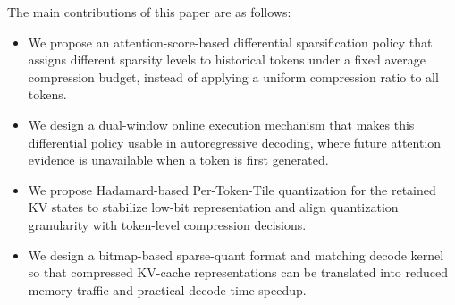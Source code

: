 \documentclass[runningheads]{llncs}
\newcommand{\method}{JSQKV}
\begin{document}
The main contributions of this paper are as follows:
\begin{itemize}
    \item We propose an attention-score-based differential sparsification policy that assigns different sparsity levels to historical tokens under a fixed average compression budget, instead of applying a uniform compression ratio to all tokens.
    \item We design a dual-window online execution mechanism that makes this differential policy usable in autoregressive decoding, where future attention evidence is unavailable when a token is first generated.
    \item We propose Hadamard-based Per-Token-Tile quantization for the retained KV states to stabilize low-bit representation and align quantization granularity with token-level compression decisions.
    \item We design a bitmap-based sparse-quant format and matching decode kernel so that compressed KV-cache representations can be translated into reduced memory traffic and practical decode-time speedup.
\end{itemize}


\end{document}
